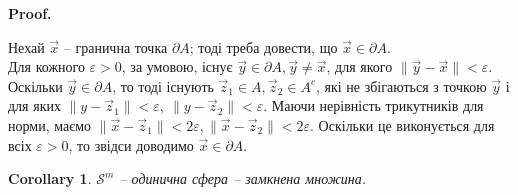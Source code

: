 \documentclass[a4paper, 10pt]{article}
\makeatletter
\def\huge{\displaystyle}
\theoremstyle{theoremdd}
\newtheorem{theorem}{Theorem}[subsection]
\theoremstyle{theoremdd}
\theoremstyle{theoremdd}
\theoremstyle{theoremdd}
\theoremstyle{theoremdd}
\theoremstyle{theoremdd}
\theoremstyle{theoremdd}
\theoremstyle{theoremdd}
\theoremstyle{theoremdd}
\newtheorem{corollary}[theorem]{Corollary}
\renewenvironment{proof}[1][Proof.\\]{\par
\pushQED{\hfill \qed}%
\normalfont \topsep6\p@\@plus6\p@\relax
\trivlist
\item\relax
{\bfseries
#1\@addpunct{.}}\hspace\labelsep\ignorespaces
}{%
\popQED\endtrivlist\@endpefalse
}
\makeatother
\begin{document}
\begin{proof}
Нехай $\vec{x}$ -- гранична точка $\partial A$; тоді треба довести, що $\vec{x} \in \partial A$.\\
Для кожного $\varepsilon > 0$, за умовою, існує $\vec{y} \in \partial A, \vec{y} \neq \vec{x}$, для якого $\|\vec{y} - \vec{x}\| < \varepsilon$. Оскільки $\vec{y} \in \partial A$, то тоді існують $\vec{z}_1 \in A, \vec{z}_2 \in A^c$, які не збігаються з точкою $\vec{y}$ і для яких $\|y - \vec{z}_1\| < \varepsilon,\ \|y - \vec{z}_2\| < \varepsilon$. Маючи нерівність трикутників для норми, маємо $\|\vec{x} - \vec{z}_1\| < 2\varepsilon, \|\vec{x} - \vec{z}_2\| < 2\varepsilon$. Оскільки це виконується для всіх $\varepsilon > 0$, то звідси доводимо $\vec{x} \in \partial A$.
\end{proof}

\begin{corollary}
$\mathcal{S}^m$ -- одинична сфера -- замкнена множина.
\end{corollary}

\iffalse
\begin{theorem}[Лема Кантора про вкладеність]
Задамо прямокутники $\Pi_n = [a_n,b_n] \times [c_n,d_n]$, які є вкладеними, тобто $\Pi_1 \supset \Pi_2 \supset \dots$. Тоді:\\
1) $\exists \vec{c} \in \mathbb{R}^2: \forall n \geq 1: \vec{c} \in \Pi_n$\\
2) Якщо додатково $\text{diam } \Pi_n \to 0, n \to \infty$, то тоді така точка - єдина. $\text{diam } A =\huge \sup_{\vec{x},\vec{y} \in A} \lVert \vec{x}-\vec{y} \rVert$
\end{theorem}

\begin{proof}
Зауважимо, що $\Pi_{n+1} \subset \Pi_n \iff \begin{cases} [a_{n+1},b_{n+1}] \subset [a_n,b_n] \\ [c_{n+1},d_{n+1}] \subset [c_n,d_n] \end{cases}$. Доводиться простенько.\\
Тоді ми маємо систему з вкладених відрізків. Тоді за лемою Кантора в матані $\mathbb{R}$, маємо, що:\\
$\exists \alpha \in \mathbb{R}: \forall n \geq 1: \alpha \in [a_n,b_n]$ та $\exists \beta \in \mathbb{R}: \forall n \geq 1: \beta \in [c_n,d_n]$. Встановимо $\vec{c} = \begin{pmatrix}
\alpha \\ \beta
\end{pmatrix}$. Тоді за декартовим добутком, $\forall n \geq 1: \vec{c} \in \Pi_n$.\\
Тепер нехай $\text{diam } \Pi_n \to 0, n \to \infty$. Тоді це означає, що $\huge \sup_{\vec{x},\vec{y} \in \Pi_n} \lVert \vec{x}-\vec{y} \rVert \to 0 \implies \\ \forall \varepsilon > 0: \exists N: \forall n \geq N: \forall \vec{x},\vec{y} \in \Pi_n: \lVert \vec{x}-\vec{y} \rVert < \varepsilon \implies \begin{cases} |x_1-y_1| < \varepsilon \\ |x_2-y_2| < \varepsilon \end{cases}$.
\end{proof}
\fi
\end{document}
